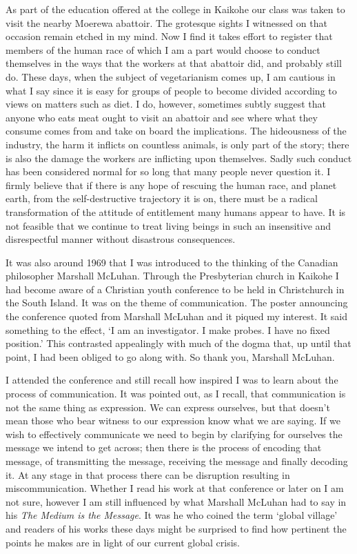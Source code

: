 \enlargethispage{\baselineskip}

As part of the education offered at the college in Kaikohe our class was
taken to visit the nearby Moerewa abattoir. The grotesque sights I
witnessed on that occasion remain etched in my mind. Now I find it takes
effort to register that members of the human race of which I am a part
would choose to conduct themselves in the ways that the workers at that
abattoir did, and probably still do. These days, when the subject of
vegetarianism comes up, I am cautious in what I say since it is easy for
groups of people to become divided according to views on matters such as
diet. I do, however, sometimes subtly suggest that anyone who eats meat
ought to visit an abattoir and see where what they consume comes from
and take on board the implications. The hideousness of the industry, the
harm it inflicts on countless animals, is only part of the story; there
is also the damage the workers are inflicting upon themselves. Sadly
such conduct has been considered normal for so long that many people
never question it. I firmly believe that if there is any hope of
rescuing the human race, and planet earth, from the self-destructive
trajectory it is on, there must be a radical transformation of the
attitude of entitlement many humans appear to have. It is not feasible
that we continue to treat living beings in such an insensitive and
disrespectful manner without disastrous consequences.

It was also around 1969 that I was introduced to the thinking of the
Canadian philosopher Marshall McLuhan\cite{mcluhan}.
Through the Presbyterian church in Kaikohe I had
become aware of a Christian youth conference to be held in Christchurch
in the South Island. It was on the theme of communication. The poster
announcing the conference quoted from Marshall McLuhan and it piqued my
interest. It said something to the effect, `I am an investigator. I make
probes. I have no fixed position.' This contrasted appealingly with much
of the dogma that, up until that point, I had been obliged to go along
with. So thank you, Marshall McLuhan.

I attended the conference and still recall how inspired I was to learn
about the process of communication. It was pointed out, as I recall,
that communication is not the same thing as expression. We can express
ourselves, but that doesn't mean those who bear witness to our
expression know what we are saying. If we wish to effectively
communicate we need to begin by clarifying for ourselves the message we
intend to get across; then there is the process of encoding that
message, of transmitting the message, receiving the message and finally
decoding it. At any stage in that process there can be disruption
resulting in miscommunication. Whether I read his work at that
conference or later on I am not sure, however I am still influenced by
what Marshall McLuhan had to say in his \emph{The Medium is the
Message}. It was he who coined the term `global village' and readers of
his works these days might be surprised to find how pertinent the points
he makes are in light of our current global crisis.


